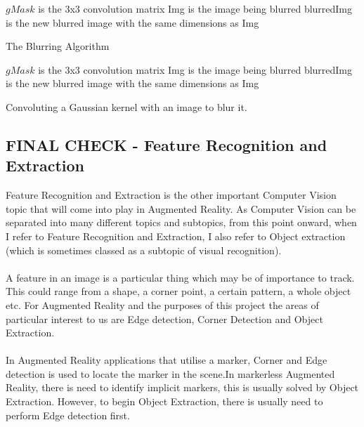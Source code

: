 \documentclass[11pt]{article}
\begin{document}
\begin{algorithm}
\DontPrintSemicolon
$gMask$ is the 3x3 convolution matrix\;
Img is the image being blurred\;
blurredImg is the new blurred image with the same dimensions as Img\;
\caption{The Blurring Algorithm}
\label{algo:blur}
\end{algorithm}

\begin{algorithm}
\DontPrintSemicolon
$gMask$ is the 3x3 convolution matrix\;
Img is the image being blurred\;
blurredImg is the new blurred image with the same dimensions as Img\;
\caption{Convoluting a Gaussian kernel with an image to blur it.}
\label{algo:gaussianblur}
\end{algorithm}

\subsection{FINAL CHECK - Feature Recognition and Extraction}
Feature Recognition and Extraction is the other important Computer Vision
topic that will come into play in Augmented Reality. As Computer Vision can
be separated into many different topics and subtopics, from this point
onward, when I refer to Feature Recognition and Extraction, I also refer
to Object extraction (which is sometimes classed as a subtopic of
visual recognition).\\
\\
A feature in an image is a particular thing which
may be of importance to track. This could range from a shape, a corner point,
a certain pattern, a whole object etc. For Augmented Reality and 
the purposes of this project the areas of particular interest to us are 
Edge detection, Corner Detection and Object Extraction.\\
\\
In Augmented Reality applications that utilise a marker, Corner and 
Edge detection is used
to locate the marker in the scene.In markerless Augmented Reality, 
there is need to identify implicit markers, this is usually solved
by Object Extraction.  However, to begin Object Extraction, 
there is usually need to perform Edge detection first.
\end{document}
